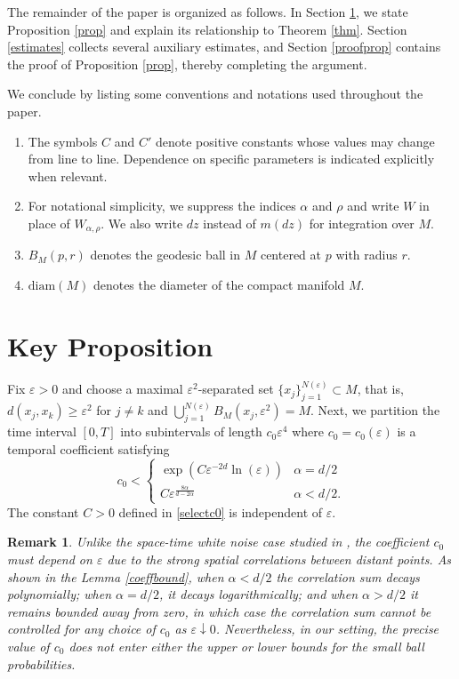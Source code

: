 \documentclass[12pt]{amsart}
\newtheorem{remark}{Remark}[section]
\numberwithin{equation}{section}
\newcommand{\1}{\mathbf{1}}
\begin{document}
The remainder of the paper is organized as follows. In Section \ref{keyprop}, we state Proposition \ref{prop} and explain its relationship to Theorem \ref{thm}. Section \ref{estimates} collects several auxiliary estimates, and Section \ref{proofprop} contains the proof of Proposition \ref{prop}, thereby completing the argument.

We conclude by listing some conventions and notations used throughout the paper.
\begin{enumerate}
\item The symbols $C$ and $C'$ denote positive constants whose values may change from line to line. Dependence on specific parameters is indicated explicitly when relevant.
\item For notational simplicity, we suppress the indices $\alpha$ and $\rho$ and write $W$ in place of $W_{\alpha,\rho}$. We also write $dz$ instead of $m(dz)$ for integration over $M$.
\item $B_M(p,r)$ denotes the geodesic ball in $M$ centered at $p$ with radius $r$.
\item $\mathrm{diam}(M)$ denotes the diameter of the compact manifold $M$.
\end{enumerate}

\section{Key Proposition}
\label{keyprop}
Fix $\varepsilon>0$ and choose a maximal $\varepsilon^2$-separated set $\{x_j\}_{j=1}^{N(\varepsilon)}\subset M$,
that is, $d(x_j,x_k)\geq\varepsilon^2$ for $j\neq k$ and $\bigcup\limits_{j=1}^{N(\varepsilon)}B_M(x_j,\varepsilon^2)=M$. Next, we partition the time interval $[0,T]$ into subintervals of length $c_0\varepsilon^4$ where $c_0=c_0(\varepsilon)$ is a temporal coefficient satisfying
\begin{equation}
\label{c0}
c_0<\begin{cases}
    \exp\left(C\varepsilon^{-2d}\ln(\varepsilon)\right)&\alpha=d/2\\
    C\varepsilon^{\frac{8\alpha}{d-2\alpha}}&\alpha<d/2.
\end{cases}
\end{equation}
The constant $C>0$ defined in \eqref{selectc0} is independent of $\varepsilon$.

\begin{remark}
Unlike the space-time white noise case studied in \cite{athreya2021small}, the coefficient $c_0$ must depend on $\varepsilon$ due to the strong spatial correlations between distant points. As shown in the Lemma \ref{coeffbound}, when $\alpha<d/2$ the correlation sum decays polynomially; when $\alpha=d/2$, it decays logarithmically; and when $\alpha>d/2$ it remains bounded away from zero, in which case the correlation sum cannot be controlled for any choice of $c_0$ as $\varepsilon\downarrow0$. Nevertheless, in our setting, the precise value of $c_0$ does not enter either the upper or lower bounds for the small ball probabilities.
\end{remark}
\end{document}
